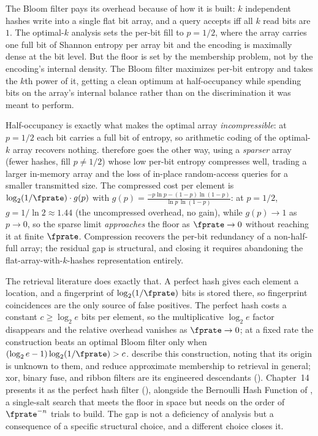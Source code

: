 The Bloom filter pays its overhead because of how it is built: $k$ independent
hashes write into a single flat bit array, and a query accepts iff all $k$ read
bits are $1$. The optimal-$k$ analysis sets the per-bit fill to $p = 1/2$,
where the array carries one full bit of Shannon entropy per array bit and the
encoding is maximally dense at the bit level. But the floor is set by the
membership problem, not by the encoding's internal density. The Bloom filter
maximizes per-bit entropy and takes the $k$th power of it, getting a clean
optimum at half-occupancy while spending bits on the array's internal balance
rather than on the discrimination it was meant to perform.

\begin{remark}
\label{rem:compressed-bloom}
Half-occupancy is exactly what makes the optimal array \emph{incompressible}:
at $p = 1/2$ each bit carries a full bit of entropy, so arithmetic coding of
the optimal-$k$ array recovers nothing. \textcite{mitzenmacher-2002} therefore
goes the other way, using a \emph{sparser} array (fewer hashes, fill $p \neq
1/2$) whose low per-bit entropy compresses well, trading a larger in-memory
array and the loss of in-place random-access queries for a smaller transmitted
size. The compressed cost per element is $\log_2(1/\fprate)\cdot g(p)$ with
$g(p) = \frac{-p\ln p - (1-p)\ln(1-p)}{\ln p\,\ln(1-p)}$: at $p = 1/2$,
$g = 1/\ln 2 \approx 1.44$ (the uncompressed overhead, no gain), while $g(p)
\to 1$ as $p \to 0$, so the sparse limit \emph{approaches} the floor as
$\fprate \to 0$ without reaching it at finite $\fprate$. Compression recovers
the per-bit redundancy of a non-half-full array; the residual gap is
structural, and closing it requires abandoning the flat-array-with-$k$-hashes
representation entirely.
\end{remark}

The retrieval literature does exactly that. A perfect hash
gives each element a location, and a fingerprint of
$\log_2(1/\fprate)$ bits is stored there, so
fingerprint coincidences are the only source of false positives. The perfect
hash costs a constant $c \ge \log_2 e$ bits per element, so the
multiplicative $\log_2 e$ factor disappears and the relative overhead
vanishes as $\fprate \to 0$; at a fixed rate the construction beats an
optimal Bloom filter only when $(\log_2 e - 1)\log_2(1/\fprate) > c$.
\textcite{dietzfelbinger-pagh-2008} describe this construction, noting that
its origin is unknown to them, and reduce approximate membership to
retrieval in general; xor, binary fuse, and ribbon filters are its
engineered descendants (). Chapter~14 presents it as
the perfect hash filter (), alongside the Bernoulli Hash
Function of , a single-salt search that meets the floor in
space but needs on the order of $\fprate^{-n}$ trials to build. The gap is not a deficiency of analysis but a consequence of a
specific structural choice, and a different choice closes it.
